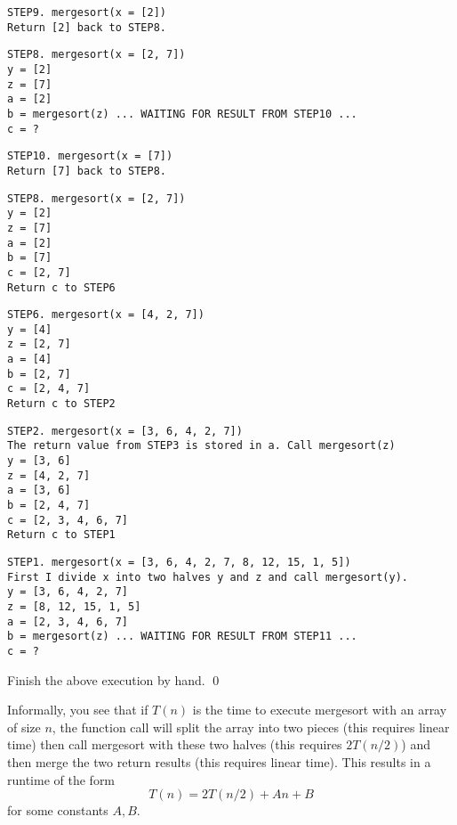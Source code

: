 \begin{Verbatim}[frame=single, fontsize=\footnotesize]
STEP9. mergesort(x = [2])
Return [2] back to STEP8.
\end{Verbatim}

\begin{Verbatim}[frame=single, fontsize=\footnotesize]
STEP8. mergesort(x = [2, 7])
y = [2]
z = [7]
a = [2]
b = mergesort(z) ... WAITING FOR RESULT FROM STEP10 ...
c = ?
\end{Verbatim}

\begin{Verbatim}[frame=single, fontsize=\footnotesize]
STEP10. mergesort(x = [7])
Return [7] back to STEP8.
\end{Verbatim}

\begin{Verbatim}[frame=single, fontsize=\footnotesize]
STEP8. mergesort(x = [2, 7])
y = [2]
z = [7]
a = [2]
b = [7]
c = [2, 7]
Return c to STEP6 
\end{Verbatim}

\begin{Verbatim}[frame=single, fontsize=\footnotesize]
STEP6. mergesort(x = [4, 2, 7])
y = [4]
z = [2, 7]
a = [4]
b = [2, 7]
c = [2, 4, 7]
Return c to STEP2
\end{Verbatim}

\begin{Verbatim}[frame=single, fontsize=\footnotesize]
STEP2. mergesort(x = [3, 6, 4, 2, 7])
The return value from STEP3 is stored in a. Call mergesort(z)
y = [3, 6]
z = [4, 2, 7]
a = [3, 6]
b = [2, 4, 7]
c = [2, 3, 4, 6, 7]
Return c to STEP1
\end{Verbatim}

\begin{Verbatim}[frame=single, fontsize=\footnotesize]
STEP1. mergesort(x = [3, 6, 4, 2, 7, 8, 12, 15, 1, 5])
First I divide x into two halves y and z and call mergesort(y).
y = [3, 6, 4, 2, 7]
z = [8, 12, 15, 1, 5]
a = [2, 3, 4, 6, 7]
b = mergesort(z) ... WAITING FOR RESULT FROM STEP11 ...
c = ?
\end{Verbatim}

\begin{ex}
Finish the above execution by hand.
\qed
\end{ex}


Informally, you see that if $T(n)$ is the time to execute
mergesort with an array of size $n$, the function call
will split the array into two pieces (this requires linear time)
then call mergesort with these two halves (this requires $2T(n/2)$)
and then merge the two return results (this requires linear time). 
This results in a runtime of the form
\[
T(n) = 2T(n/2) + An + B
\]
for some constants $A,B$.

